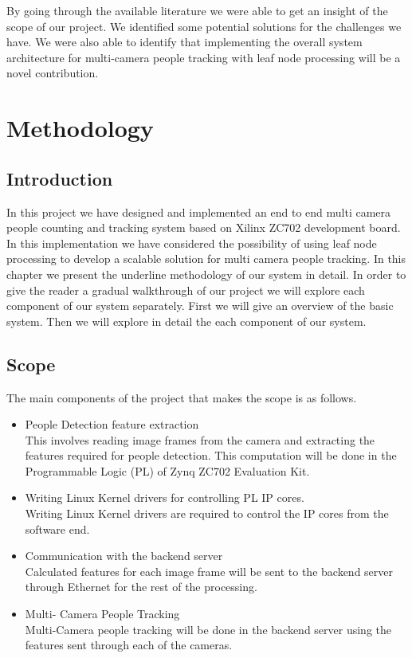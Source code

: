 \documentclass[12pt,a4paper]{report}
\begin{document}
By going through the available literature we were able to get an insight of the scope of our project. We identified some potential solutions for the challenges we have. We were also able to identify that implementing the overall system architecture for multi-camera people tracking with leaf node processing will be a novel contribution. 


\chapter{Methodology}
\section{Introduction}
In this project we have designed and implemented an end to end multi camera people counting and tracking system based on Xilinx ZC702 development board. In this implementation we have considered the possibility of using leaf node processing to develop a scalable solution for multi camera people tracking. In this chapter we present the underline methodology of our system in detail.
In order to give the reader a gradual walkthrough of our project we will explore each component of our system separately. First we will give an overview of the basic system. Then we will explore in detail the each component of our system. 
\section{Scope}
The main components of the project that makes the scope is as follows.
\begin{itemize}
\item People Detection feature extraction\\
This involves reading image frames from the camera and extracting the features
required for people detection. This computation will be done in the Programmable
Logic (PL) of Zynq ZC702 Evaluation Kit.
\item Writing Linux Kernel drivers for controlling PL IP cores.\\
Writing Linux Kernel drivers are required to control the IP cores from the software end.
\item Communication with the backend server \\
Calculated features for each image frame will be sent to the backend server through Ethernet for the rest of the processing.
\item Multi- Camera People Tracking \\
Multi-Camera people tracking will be done in the backend server using the features sent through each of the cameras.


\end{itemize}
\end{document}
